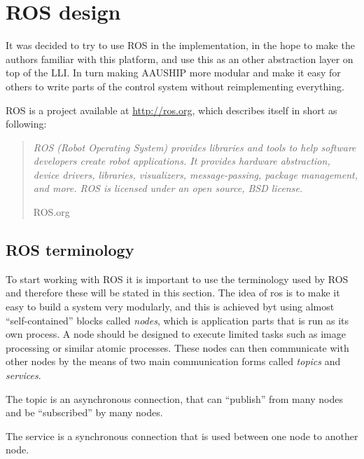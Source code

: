 \chapter{\acs{ROS} design}

It was decided to try to use \ac{ROS} in the implementation, in the
hope to make the authors familiar with this platform, and use this as
an other abstraction layer on top of the \ac{LLI}. In turn making
AAUSHIP more modular and make it easy for others to write parts of the
control system without reimplementing everything. 

\ac{ROS} is a project available at \url{http://ros.org}, which
describes itself in short as following:

\begin{quote}
\noindent	\textit{
	ROS (Robot Operating System) provides libraries and
	tools to help software developers create robot applications. It
	provides hardware abstraction, device drivers, libraries,
	visualizers, message-passing, package management, and more. ROS is
licensed under an open source, BSD license.}
		
	\hfill ROS.org
\end{quote}



\section{\acs{ROS} terminology}
To start working with \ac{ROS} it is important to use the terminology
used by \ac{ROS} and therefore these  will be stated in this section.
The idea of ros is to make it easy to build a system very modularly,
and this is achieved byt using almost ``self-contained'' blocks called
\textit{nodes}, which is application parts that is run as its own
process. A node should be designed to execute limited tasks such as
image processing or similar atomic processes. These nodes can then
communicate with other nodes by the means of two main communication
forms called \textit{topics} and \textit{services}.

The topic is an asynchronous connection, that can ``publish'' from many
nodes and be ``subscribed'' by many nodes.

The service is a synchronous connection that is used between one node
to another node.

